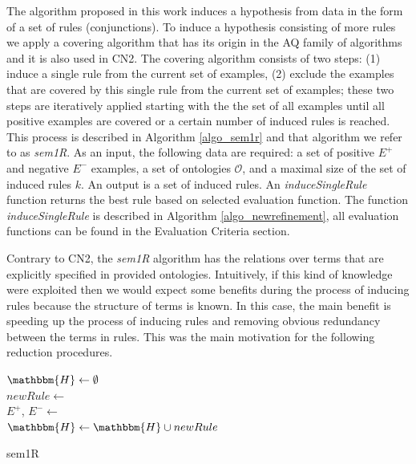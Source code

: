 \documentclass{bmcart}
\begin{document}
The algorithm proposed in this work induces a hypothesis from data in the form of a set of rules (conjunctions). To induce a hypothesis consisting of more rules we apply a covering algorithm that has its origin in the AQ family of algorithms \cite{michalski1969quasi} and it is also used in CN2. The covering algorithm consists of two steps: (1) induce a single rule from the current set of examples, (2) exclude the examples that are covered by this single rule from the current set of examples; these two steps are iteratively applied starting with the the set of all examples until all positive examples are covered or a certain number of induced rules is reached. This process is described in Algorithm \ref{algo_sem1r} and that algorithm we refer to as \emph{sem1R}. As an input, the following data are required: a set of positive $E^{+}$ and negative $E^{-}$ examples, a set of ontologies $\mathcal{O}$, and a maximal size of the set of induced rules $k$. An output is a set of induced rules. An \emph{induceSingleRule} function returns the best rule based on selected evaluation function. The function \emph{induceSingleRule} is described in Algorithm \ref{algo_newrefinement}, all evaluation functions can be found in the Evaluation Criteria section.

Contrary to CN2, the \emph{sem1R} algorithm has the relations over terms that are explicitly specified in provided ontologies. Intuitively, if this kind of knowledge were exploited then we would expect some benefits during the process of inducing rules because the structure of terms is known. In this case, the main benefit is speeding up the process of inducing rules and removing obvious redundancy between the terms in rules. This was the main motivation for the following reduction procedures.


\begin{algorithm}[!t]
\BlankLine
$\mathbbm{H} \leftarrow \emptyset$\\
{
    $newRule \leftarrow$ \\
    $E^{+}$, $E^{-} \leftarrow$ \\
	$\mathbbm{H} \leftarrow \mathbbm{H} \cup newRule$\\
}
\caption{sem1R}\label{algo_sem1r}
\end{algorithm}
\end{document}
